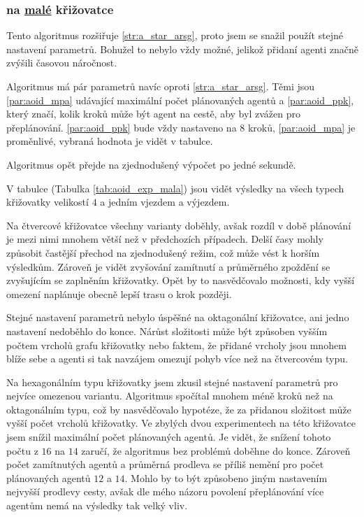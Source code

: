 \subsubsection{ na \hyperref[par:data_mala]{malé} křižovatce}
\label{subsubsec:exp_aoid_mala_krizovatka}

Tento algoritmus rozšiřuje \ref{str:a_star_arsg}, proto jsem se snažil použít stejné nastavení parametrů.
Bohužel to nebylo vždy možné, jelikož přidaní agenti značně zvýšili časovou náročnost.

Algoritmus má pár parametrů navíc oproti \ref{str:a_star_arsg}.
Těmi jsou \ref{par:aoid_mpa} udávající maximální počet plánovaných agentů
a \ref{par:aoid_ppk}, který značí, kolik kroků může být agent na cestě, aby byl zvážen pro přeplánování.
\ref{par:aoid_ppk} bude vždy nastaveno na $8$ kroků,
\ref{par:aoid_mpa} je proměnlivé, vybraná hodnota je vidět v tabulce.

Algoritmus opět přejde na zjednodušený výpočet po jedné sekundě.




V tabulce (Tabulka \ref{tab:aoid_exp_mala}) jsou vidět výsledky na všech typech křižovatky
velikostí $4$ a jedním vjezdem a výjezdem.

Na čtvercové křižovatce všechny varianty doběhly,
avšak rozdíl v době plánování je mezi nimi mnohem větší než v předchozích případech.
Delší časy mohly způsobit častější přechod na zjednodušený režim, což může vést k horším výsledkům.
Zároveň je vidět zvyšování zamítnutí a průměrného zpoždění se zvyšujícím se zaplněním křižovatky.
Opět by to nasvědčovalo možnosti, kdy vyšší omezení naplánuje obecně lepší trasu o krok později.

Stejné nastavení parametrů nebylo úspěšné na oktagonální křižovatce, ani jedno nastavení nedoběhlo do konce.
Nárůst složitosti může být způsoben vyšším počtem vrcholů grafu křižovatky
nebo faktem, že přidané vrcholy jsou mnohem blíže sebe
a agenti si tak navzájem omezují pohyb více než na čtvercovém typu.

Na hexagonálním typu křižovatky jsem zkusil stejné nastavení parametrů pro nejvíce omezenou variantu.
Algoritmus spočítal mnohem méně kroků než na oktagonálním typu, což by nasvědčovalo hypotéze,
že za přidanou složitost může vyšší počet vrcholů křižovatky.
Ve zbylých dvou experimentech na této křižovatce jsem snížil maximální počet plánovaných agentů.
Je vidět, že snížení tohoto počtu z $16$ na $14$ zaručí, že algoritmus bez problémů doběhne do konce.
Zároveň počet zamítnutých agentů a průměrná prodleva se příliš nemění pro počet plánovaných agentů $12$ a $14$.
Mohlo by to být způsobeno jiným nastavením nejvyšší prodlevy cesty,
avšak dle mého názoru povolení přeplánování více agentům nemá na výsledky tak velký vliv.

